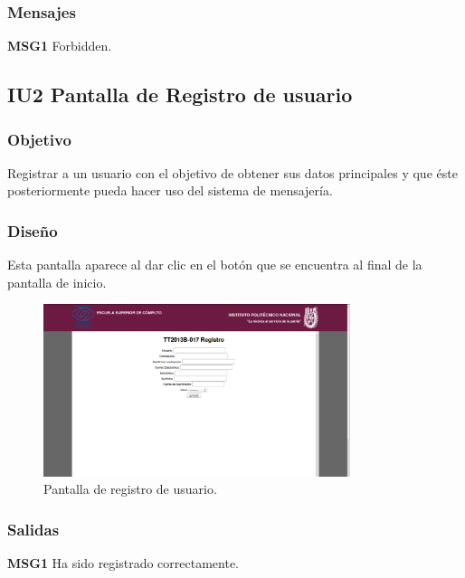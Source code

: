 \subsubsection{Mensajes}
	\begin{Citemize}
		\item {\bf MSG1} Forbidden.	\end{Citemize}
		
	\pagebreak		%
		
		\subsection{IU2 Pantalla de Registro de usuario}

\subsubsection{Objetivo}
	Registrar a un usuario con el objetivo de obtener sus datos principales y que \'este posteriormente pueda hacer uso del sistema de mensajer\'ia.

\subsubsection{Dise\~no}
	Esta pantalla aparece al dar clic en el bot\'on  que se encuentra al final de la pantalla de inicio.

	\begin{figure}[htbp!]
		\centering
			\includegraphics[width=0.8\textwidth]{images/Modulo1/Registro}
		\caption{Pantalla de registro de usuario.}
	\end{figure}

\subsubsection{Salidas}
	\begin{Citemize}
		\item {\bf MSG1} Ha sido registrado correctamente.	
	\end{Citemize}
	


